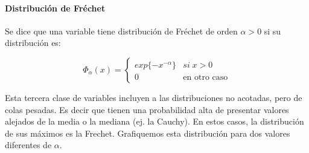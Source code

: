 \documentclass[
  12pt]{article}
\begin{document}
\hypertarget{distribuciuxf3n-de-fruxe9chet}{%
\paragraph{Distribución de
Fréchet}\label{distribuciuxf3n-de-fruxe9chet}}

Se dice que una variable tiene distribución de Fréchet de orden
\(\alpha>0\) si su distribución es:

\[
\Phi_{\alpha}(x)=\begin{cases}
exp\{-x^{-\alpha}\} & si\;x>0\\
0 & \text{en otro caso}
\end{cases}
\]

Esta tercera clase de variables incluyen a las distribuciones no
acotadas, pero de colas pesadas. Es decir que tienen una probabilidad
alta de presentar valores alejados de la media o la mediana (ej. la
Cauchy). En estos casos, la distribución de sus máximos es la Frechet.
Grafiquemos esta distribución para dos valores diferentes de \(\alpha\).
\end{document}
